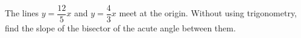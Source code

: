 The lines $y=\dfrac{12}{5}x$ and $y=\dfrac{4}{3}x$ meet at the origin. Without using trigonometry, find the slope of the bisector of the acute angle between them.
